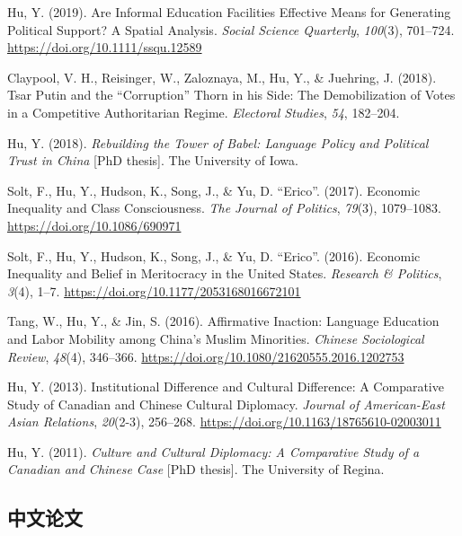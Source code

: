 \documentclass[11pt,a4paper,]{awesome-cv}
\begin{document}
\leavevmode{}%
Hu, Y. (2019). Are Informal Education Facilities Effective Means for
Generating Political Support? A Spatial Analysis. \emph{Social Science
Quarterly}, \emph{100}(3), 701--724.
\url{https://doi.org/10.1111/ssqu.12589}

\leavevmode{}%
Claypool, V. H., Reisinger, W., Zaloznaya, M., Hu, Y., \& Juehring, J.
(2018). Tsar Putin and the {``Corruption''} Thorn in his Side: The
Demobilization of Votes in a Competitive Authoritarian Regime.
\emph{Electoral Studies}, \emph{54}, 182--204.

\leavevmode{}%
Hu, Y. (2018). \emph{Rebuilding the Tower of Babel: Language Policy and
Political Trust in China} {[}PhD thesis{]}. The University of Iowa.

\leavevmode{}%
Solt, F., Hu, Y., Hudson, K., Song, J., \& Yu, D. ``Erico''. (2017).
Economic Inequality and Class Consciousness. \emph{The Journal of
Politics}, \emph{79}(3), 1079--1083.
\url{https://doi.org/10.1086/690971}

\leavevmode{}%
Solt, F., Hu, Y., Hudson, K., Song, J., \& Yu, D. ``Erico''. (2016).
Economic Inequality and Belief in Meritocracy in the United States.
\emph{Research \& Politics}, \emph{3}(4), 1--7.
\url{https://doi.org/10.1177/2053168016672101}

\leavevmode{}%
Tang, W., Hu, Y., \& Jin, S. (2016). Affirmative Inaction: Language
Education and Labor Mobility among China's Muslim Minorities.
\emph{Chinese Sociological Review}, \emph{48}(4), 346--366.
\url{https://doi.org/10.1080/21620555.2016.1202753}

\leavevmode{}%
Hu, Y. (2013). Institutional Difference and Cultural Difference: A
Comparative Study of Canadian and Chinese Cultural Diplomacy.
\emph{Journal of American-East Asian Relations}, \emph{20}(2-3),
256--268. \url{https://doi.org/10.1163/18765610-02003011}

\leavevmode{}%
Hu, Y. (2011). \emph{Culture and Cultural Diplomacy: A Comparative Study
of a Canadian and Chinese Case} {[}PhD thesis{]}. The University of
Regina.

\endgroup

\hypertarget{ux4e2dux6587ux8bbaux6587}{%
\subsection{\texorpdfstring{\textbf{中文论文}}{中文论文}}\label{ux4e2dux6587ux8bbaux6587}}
\end{document}
